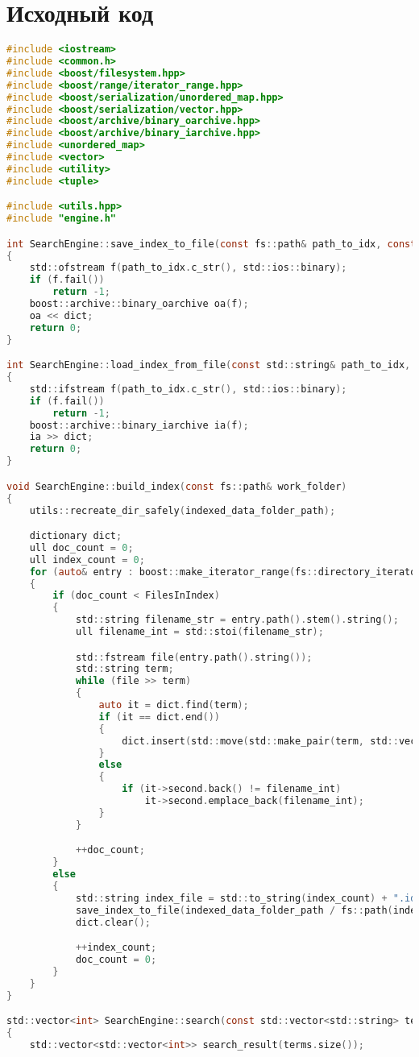 \section{Исходный код}
\begin{lstlisting}[language=C]
#include <iostream>
#include <common.h>
#include <boost/filesystem.hpp>
#include <boost/range/iterator_range.hpp>
#include <boost/serialization/unordered_map.hpp>
#include <boost/serialization/vector.hpp>
#include <boost/archive/binary_oarchive.hpp> 
#include <boost/archive/binary_iarchive.hpp> 
#include <unordered_map>
#include <vector>
#include <utility>
#include <tuple>

#include <utils.hpp>
#include "engine.h"

int SearchEngine::save_index_to_file(const fs::path& path_to_idx, const dictionary& dict)
{
	std::ofstream f(path_to_idx.c_str(), std::ios::binary);
	if (f.fail()) 
		return -1;
	boost::archive::binary_oarchive oa(f);
	oa << dict;
	return 0;
}

int SearchEngine::load_index_from_file(const std::string& path_to_idx, dictionary& dict)
{
	std::ifstream f(path_to_idx.c_str(), std::ios::binary);
	if (f.fail())
		return -1;
	boost::archive::binary_iarchive ia(f);
	ia >> dict;
	return 0;
}

void SearchEngine::build_index(const fs::path& work_folder)
{
	utils::recreate_dir_safely(indexed_data_folder_path);

	dictionary dict;
	ull doc_count = 0;
	ull index_count = 0;
	for (auto& entry : boost::make_iterator_range(fs::directory_iterator(tokenized_data_folder_path), {}))
	{
		if (doc_count < FilesInIndex)
		{
			std::string filename_str = entry.path().stem().string();
			ull filename_int = std::stoi(filename_str);

			std::fstream file(entry.path().string());
			std::string term;
			while (file >> term)
			{
				auto it = dict.find(term);
				if (it == dict.end())
				{
					dict.insert(std::move(std::make_pair(term, std::vector<ull>{filename_int})));
				}
				else
				{
					if (it->second.back() != filename_int)
						it->second.emplace_back(filename_int);
				}
			}

			++doc_count;
		}
		else
		{
			std::string index_file = std::to_string(index_count) + ".idx";
			save_index_to_file(indexed_data_folder_path / fs::path(index_file), dict);
			dict.clear();

			++index_count;
			doc_count = 0;
		}
	}
}

std::vector<int> SearchEngine::search(const std::vector<std::string> terms)
{
	std::vector<std::vector<int>> search_result(terms.size());


\end{lstlisting}

